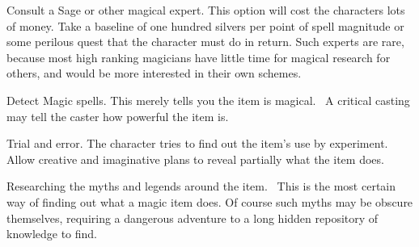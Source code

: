 Consult a Sage or other magical expert. This option will cost the characters lots of money. Take a baseline of one hundred silvers per point of spell magnitude or some perilous quest that the character must do in return. Such experts are rare, because most high ranking magicians have little time for magical research for others, and would be more interested in their own schemes. 

Detect Magic spells. This merely tells you the item is magical.  A critical casting may tell the caster how powerful the item is.

Trial and error. The character tries to find out the item’s use by experiment. Allow creative and imaginative plans to reveal partially what the item does.

Researching the myths and legends around the item.  This is the most certain way of finding out what a magic item does. Of course such myths may be obscure themselves, requiring a dangerous adventure to a long hidden repository of knowledge to find.

